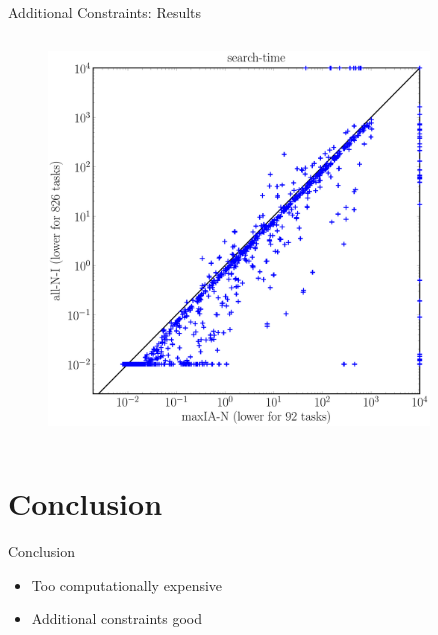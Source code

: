 \documentclass[aspectratio=169, xcolor=dvipsnames]{beamer}
\begin{document}
\begin{frame}[c]{Additional Constraints: Results}
\begin{columns}
            \begin{figure}
                \includegraphics[width=0.9\textwidth]{all_max_search}
            \end{figure}
        \end{columns}
    \end{frame}

    \section{Conclusion}
    \begin{frame}[c]{Conclusion}
        \begin{itemize}
            \item Too computationally expensive
            \item Additional constraints good
        \end{itemize}
    \end{frame}

    \begin{frame}[t,plain]
    \end{frame}

    \backupbegin
\end{document}
